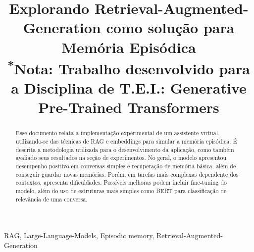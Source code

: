 \documentclass[conference]{IEEEtran}
\begin{document}
\title{Explorando Retrieval-Augmented-Generation como solução para Memória Episódica\\
{\footnotesize \textsuperscript{*}Nota: Trabalho desenvolvido para a Disciplina de T.E.I.: Generative Pre-Trained Transformers}
}

\author{
\and
{}
\and
{}
}

\maketitle

\begin{abstract}
Esse documento relata a implementação experimental de um assistente virtual, utilizando-se das técnicas de RAG e embeddings para simular a memória episódica. É descrita a metodologia utilizada para o desenvolvimento da aplicação, como também avaliado seus resultados na seção de experimentos. No geral, o modelo apresentou desempenho positivo em conversas simples e recuperação de memória básica, além de conseguir guardar novas memórias. Porém, em tarefas mais complexas dependente dos contextos, apresenta dificuldades. Possíveis melhoras podem incluir fine-tuning do modelo, além do uso de estruturas mais simples como BERT para classificação de relevância de uma conversa.
\end{abstract}

\begin{IEEEkeywords}
RAG, Large-Language-Models, Episodic memory, Retrieval-Augmented-Generation
\end{IEEEkeywords}
\end{document}
